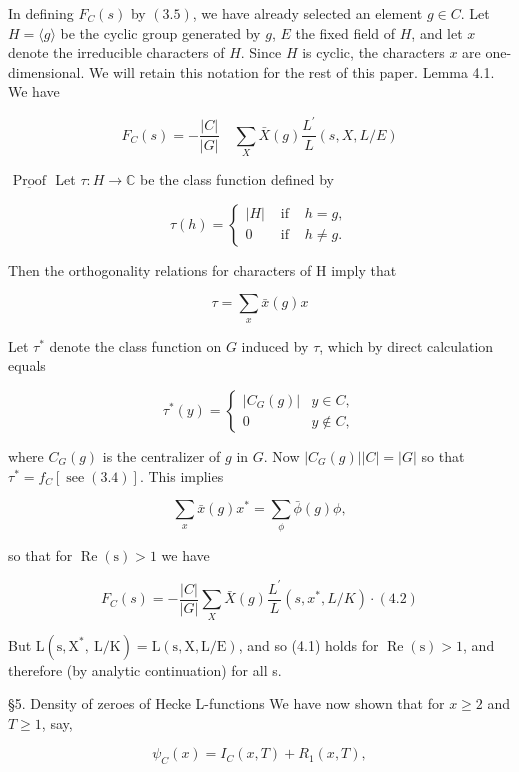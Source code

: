 In defining $F_{C}(s)$ by $(3.5)$, we have already selected an element $g \in C$. Let $H=\langle g\rangle$ be the cyclic group generated by $g$, $E$ the fixed field of $H$, and let $x$ denote the irreducible characters of $H$. Since $H$ is cyclic, the characters $x$ are one-dimensional. We will retain this notation for the rest of this paper. Lemma 4.1. We have

$$
F_{C}(s)=-\frac{|C|}{|G|} \quad \sum_{X} \bar{X}(g) \frac{L^{\prime}}{L}(s, X, L / E)
$$

$\underline{\text { Proof }}$ Let $\tau: H \rightarrow \mathbb{C}$ be the class function defined by

$$
\tau(h)=\left\{\begin{array}{lll}
|H| & \text { if } & h=g, \\
0 & \text { if } & h \neq g .
\end{array}\right.
$$

Then the orthogonality relations for characters of $\mathrm{H}$ imply that

$$
\tau=\sum_{x} \bar{x}(g) x
$$

Let $\tau^{*}$ denote the class function on $G$ induced by $\tau$, which by direct calculation equals

$$
\tau^{*}(y)=\left\{\begin{array}{cc}
\left|C_{G}(g)\right| & y \in C, \\
0 & y \notin C,
\end{array}\right.
$$

where $C_{G}(g)$ is the centralizer of $g$ in $G$. Now $\left|C_{G}(g)\right||C|=|G|$ so that $\tau^{*}=f_{C}[\operatorname{see}(3.4)]$. This implies

$$
\sum_{x} \bar{x}(g) x^{*}=\sum_{\phi} \bar{\phi}(g) \phi,
$$

so that for $\operatorname{Re}(\mathrm{s})>1$ we have 

$$
F_{C}(s)=-\frac{|C|}{|G|} \sum_{X} \bar{X}(g) \frac{L^{\prime}}{L}\left(s, x^{*}, L / K\right) \cdot(4.2)
$$

But $\mathrm{L}\left(\mathrm{s}, \mathrm{X}^{*}, \mathrm{~L} / \mathrm{K}\right)=\mathrm{L}(\mathrm{s}, \mathrm{X}, \mathrm{L} / \mathrm{E})$, and so (4.1) holds for $\operatorname{Re}(\mathrm{s})>1$, and therefore (by analytic continuation) for all s.

§5. Density of zeroes of Hecke L-functions We have now shown that for $x \geqslant 2$ and $T \geqslant 1$, say,

$$
\psi_{C}(x)=I_{C}(x, T)+R_{1}(x, T),
$$

